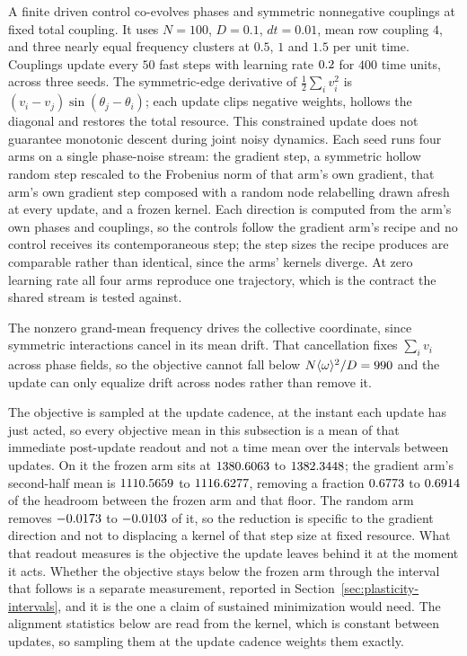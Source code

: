 \documentclass{article}
\begin{document}
A finite driven control co-evolves phases and symmetric nonnegative couplings
at fixed total coupling. It uses $N=100$, $D=0.1$, $dt=0.01$, mean row coupling
$4$, and three nearly equal frequency clusters at $0.5$, $1$ and $1.5$ per unit
time. Couplings update every $50$ fast steps with learning rate
$0.2$ for $400$ time units, across three seeds. The
symmetric-edge derivative of
$\frac12\sum_i v_i^2$ is $(v_i-v_j)\sin(\theta_j-\theta_i)$; each update clips
negative weights, hollows the diagonal and restores the total resource.
This constrained update does not guarantee monotonic descent during joint noisy dynamics.
Each seed runs four arms on a single phase-noise stream: the gradient step, a
symmetric hollow random step rescaled to the Frobenius norm of that arm's own
gradient, that arm's own gradient step composed with a random node relabelling
drawn afresh at every update, and a frozen kernel. Each direction is computed
from the arm's own phases and couplings, so the controls follow the gradient
arm's recipe and no control receives its contemporaneous step; the step sizes
the recipe produces are comparable rather than identical, since the arms'
kernels diverge. At zero learning rate all four arms reproduce one
trajectory, which is the contract the shared stream is tested against.

The nonzero grand-mean frequency drives the collective coordinate, since
symmetric interactions cancel in its mean drift. That cancellation fixes
$\sum_i v_i$ across phase fields, so the objective cannot fall below
$N\langle\omega\rangle^2/D=990$ and the update can only
equalize drift across nodes rather than remove it.

The objective is sampled at the update cadence, at the instant each update has
just acted, so every objective mean in this subsection is a mean of that
immediate post-update readout and not a time mean over the intervals between
updates. On it the frozen arm sits at
$1380.6063$ to $1382.3448$; the
gradient arm's second-half mean is $1110.5659$ to
$1116.6277$, removing a fraction $0.6773$ to
$0.6914$ of the headroom between the frozen arm and that floor.
The random arm removes $-0.0173$ to
$-0.0103$ of it, so the reduction is specific to the gradient
direction and not to displacing a kernel of that step size at fixed resource.
What that readout measures is the objective the update leaves behind it at the
moment it acts. Whether the objective stays below the frozen arm through the
interval that follows is a separate measurement, reported in
Section~\ref{sec:plasticity-intervals}, and it is the one a claim of sustained
minimization would need.
The alignment statistics below are read from the kernel, which is constant
between updates, so sampling them at the update cadence weights them exactly.
\end{document}
